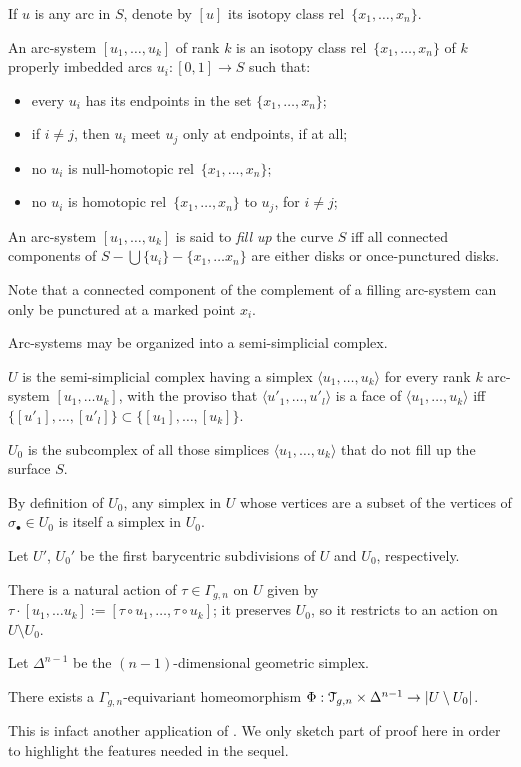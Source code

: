 If $u$ is any arc in $S$, denote by $[u]$ its isotopy class rel~$\{x_1,
\ldots, x_n\}$.
\begin{definition}
  An arc-system $[u_1, \ldots, u_k]$ of rank $k$ is an isotopy class
  rel~$\{x_1, \ldots, x_n\}$ of $k$ properly imbedded arcs $u_i : [0,1] \to S$
  such that:
  \begin{itemize}
  \item every $u_i$ has its endpoints in the set $\{x_1, \ldots, x_n\}$;
  \item if $i \neq j$, then $u_i$ meet $u_j$ only at endpoints, if at all;
  \item no $u_i$ is null-homotopic rel~$\{x_1, \ldots, x_n\}$;
  \item no $u_i$ is homotopic rel~$\{x_1, \ldots, x_n\}$ to $u_j$, for $i \neq
    j$;
  \end{itemize}
  An arc-system $[u_1, \ldots, u_k]$ is said to \emph{fill up} the curve
  $S$ iff all connected components of $S - \bigcup\{u_i\} - \{x_1,\ldots x_n\}$ are
  either disks or once-punctured disks.
\end{definition}
Note that a connected component of the complement of a filling
arc-system can only be punctured at a marked point $x_i$.

Arc-systems may be organized into a semi-simplicial complex.
\begin{definition}
  $U$ is the semi-simplicial complex having a simplex $\langle u_1, \ldots, u_k\rangle$
  for every rank $k$ arc-system $[u_1, \ldots u_k]$, with the proviso that
  $\langle u'_1, \ldots, u'_l\rangle$ is a face of $\langle u_1, \ldots, u_k\rangle$ iff $\{ [u'_1], \ldots,
  [u'_l] \} \subset \{ [u_1], \ldots, [u_k] \}$.
  
  $U_0$ is the subcomplex of all those simplices $\langle u_1, \ldots, u_k\rangle$
  that do not fill up the surface $S$.
\end{definition}
By definition of $U_0$, any simplex in $U$ whose vertices are a subset
of the vertices of $\sigma_\bullet \in U_0$ is itself a simplex in $U_0$.

Let $U'$, $U_0'$ be the first barycentric subdivisions of $U$
and $U_0$, respectively.

There is a natural action of $\tau \in \Gamma_{g,n}$ on $U$ given by $\tau \cdot [u_1, \ldots
u_k] := [\tau \circ u_1, \ldots, \tau \circ u_k]$; it preserves $U_0$, so it restricts to
an action on $U \setminus U_0$.

Let $\Delta^{n-1}$ be the $(n-1)$-dimensional geometric simplex.
\begin{theorem}
  \label{thm:H}
  There exists a $\Gamma_{g,n}$-equivariant homeomorphism $\Phi: \mathcal{T}_{g,n} \times
  \Delta^{n-1} \to |U \setminus U_0|$.
\end{theorem}
This is infact another application of .  We only sketch
part of proof here in order to highlight the features needed in the
sequel. 

